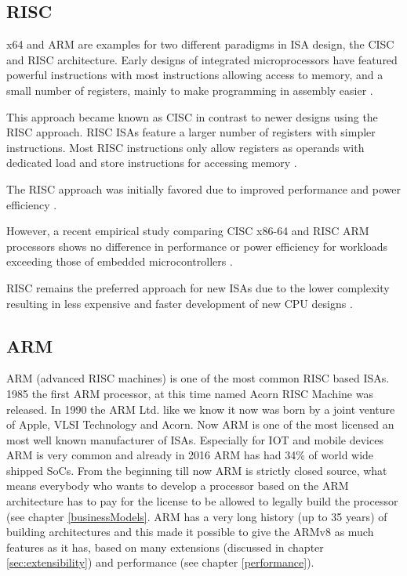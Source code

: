 \documentclass[conference]{IEEEtran}
\begin{document}
	\subsection{RISC}
	x64 and ARM are examples for two different paradigms in \gls{ISA} design, the \gls{CISC} and \gls{RISC} architecture.
	Early designs of integrated microprocessors have featured powerful instructions with most instructions allowing access to memory,
	and a small number of registers, mainly to make programming in assembly easier \cite{George1990}.

	This approach became known as \gls{CISC} in contrast to newer designs using the \gls{RISC} approach.
	\gls{RISC} \glspl{ISA} feature a larger number of registers with simpler instructions.
	Most \gls{RISC} instructions only allow registers as operands with dedicated load and store instructions for accessing memory \cite{George1990}.

	The \gls{RISC} approach was initially favored due to improved performance and power efficiency \cite{George1990}.
	
	However, a recent empirical study comparing \gls{CISC} x86-64 and \gls{RISC} ARM processors shows no difference in performance or power efficiency
	for workloads exceeding those of embedded microcontrollers \cite{Blem2013}.

	\gls{RISC} remains the preferred approach for new \glspl{ISA} due to the lower complexity resulting in less expensive and faster
	development of new CPU designs \cite{George1990}. 

	\subsection{ARM}
	ARM (advanced RISC machines) is one of the most common \gls{RISC} based \glspl{ISA}. 1985 the first ARM processor, at this time named Acorn RISC Machine was released. In 1990 the ARM Ltd. like we know it now was born by a joint venture of Apple, VLSI Technology and Acorn. \cite{Levy2005}
	 Now ARM is one of the most licensed an most well known manufacturer of \glspl{ISA}. Especially for IOT and mobile devices ARM is very common and already in 2016 ARM has had 34\% of world wide shipped SoCs. \cite{Holdings2018}
	From the beginning till now ARM is strictly closed source, what means everybody who wants to develop a processor based on the ARM architecture has to pay for the license to be allowed to legally build the processor (see chapter \ref{businessModels}. ARM has a very long history (up to 35 years) of building architectures and this made it possible to give the ARMv8 as much features as it has, based on many extensions (discussed in chapter \ref{sec:extensibility}) and performance (see chapter \ref{performance}).
	
\end{document}
